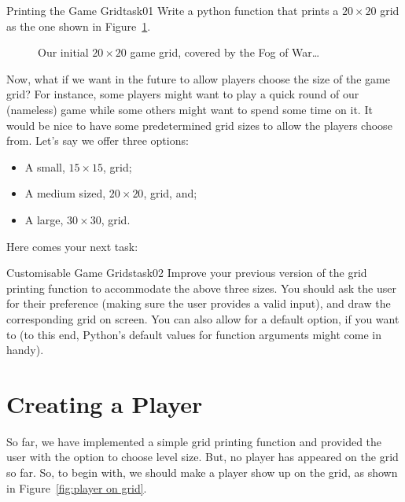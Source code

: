 \documentclass[a4paper, 11pt]{article}
\numberwithin{equation}{section}
\theoremstyle{definition}
\newcommand{\fow}{\texttt{*}}
\begin{document}
	\begin{task}{Printing the Game Grid}{task01}
		Write a python function that prints a $20\times 20$ grid as the one shown in Figure~\ref{fig:game grid}.
	\end{task}
	
	\begin{figure}[tb]
		\centering
		\caption{Our initial $20\times 20$ game grid, covered by the Fog of War\ldots}
		\label{fig:game grid}
	\end{figure}
	
	Now, what if we want in the future to allow players choose the size of the game grid? For instance, some players might want to play a quick round of our (nameless) game while some others might want to spend some time on it. It would be nice to have some predetermined grid sizes to allow the players choose from. Let's say we offer three options:
	\begin{itemize}
		\item A small, $15\times 15$, grid;
		\item A medium sized, $20\times 20$, grid, and;
		\item A large, $30\times 30$, grid.
	\end{itemize}
	
	Here comes your next task:
	\begin{task}{Customisable Game Grids}{task02}
		Improve your previous version of the grid printing function to accommodate the above three sizes. You should ask the user for their preference (making sure the user provides a valid input), and draw the corresponding grid on screen. You can also allow for a default option, if you want to (to this end, Python's default values for function arguments might come in handy).
	\end{task}
	\section{Creating a Player}
	So far, we have implemented a simple grid printing function and provided the user with the option to choose level size. But, no player has appeared on the grid so far. So, to begin with, we should make a player show up on the grid, as shown in Figure~\ref{fig:player on grid}.
	
\end{document}
